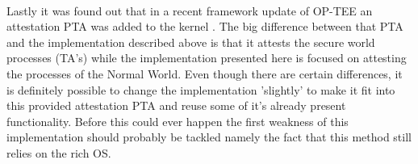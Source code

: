 \paragraph*{}%
Lastly it was found out that in a recent framework update of OP-TEE an attestation PTA was added to the kernel \cite{OPTEE3.17}. The big difference between that PTA and the implementation described above is that it attests the secure world processes (TA's) while the implementation presented here is focused on attesting the processes of the Normal World. Even though there are certain differences, it is definitely possible to change the implementation 'slightly' to make it fit into this provided attestation PTA and reuse some of it's already present functionality. Before this could ever happen the first weakness of this implementation should probably be tackled namely the fact that this method still relies on the rich OS.